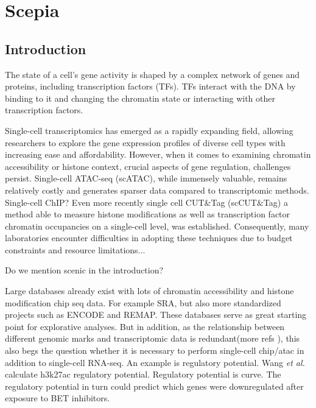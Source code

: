 \chapter{Scepia}\thumbforchapter
{}
\newpage

\section{Introduction}

The state of a cell's gene activity is shaped by a complex network of genes and proteins, including transcription factors (TFs). TFs interact with the DNA by binding to it and changing the chromatin state or interacting with other transcription factors. 

Single-cell transcriptomics has emerged as a rapidly expanding field, allowing researchers to explore the gene expression profiles of diverse cell types with increasing ease and affordability. However, when it comes to examining chromatin accessibility or histone context, crucial aspects of gene regulation, challenges persist. Single-cell ATAC-seq (scATAC), while immensely valuable, remains relatively costly and generates sparser data compared to transcriptomic methods. Single-cell ChIP? Even more recently single cell CUT\&Tag (scCUT\&Tag) a method able to measure histone modifications as well as transcription factor chromatin occupancies on a single-cell level, was established. 
Consequently, many laboratories encounter difficulties in adopting these techniques due to budget constraints and resource limitations...



Do we mention scenic in the introduction? 

Large databases already exist with lots of chromatin accessibility and histone modification chip seq data. For example SRA, but also more standardized projects such as ENCODE and REMAP. These databases serve as great starting point for explorative analyses. But in addition, as the relationship between different genomic marks and transcriptomic data is redundant(more refs \cite{Wang2016}), this also begs the question whether it is necessary to perform single-cell chip/atac in addition to single-cell RNA-seq. An example is regulatory potential. Wang \textit{et al.} calculate h3k27ac regulatory potential. Regulatory potential is curve. The regulatory potential in turn could predict which genes were downregulated after exposure to BET inhibitors.

